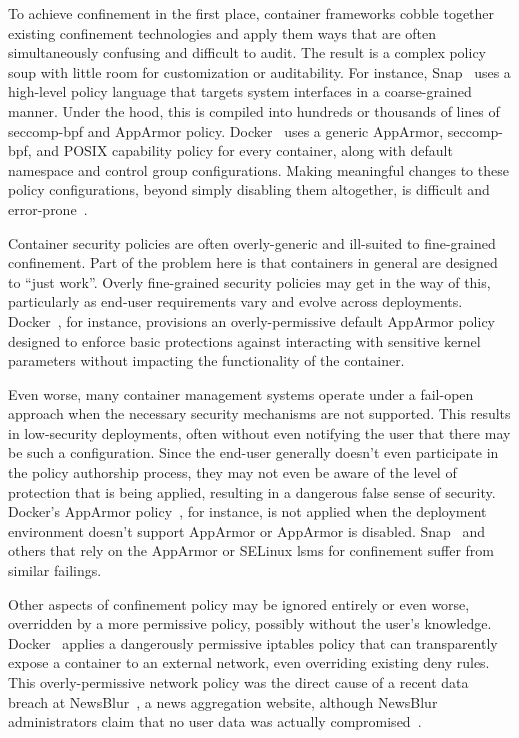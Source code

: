 To achieve confinement in the first place, container frameworks cobble together existing
confinement technologies and apply them ways that are often simultaneously confusing and
difficult to audit. The result is a complex policy soup with little room for customization
or auditability. For instance, Snap~\cite{snap} uses a high-level policy language that
targets system interfaces in a coarse-grained manner. Under the hood, this is compiled
into hundreds or thousands of lines of seccomp-bpf and AppArmor policy.
Docker~\cite{docker_security, docker_default_apparmor, docker_apparmor} uses a generic
AppArmor, seccomp-bpf, and POSIX capability policy for every container, along with default
namespace and control group configurations. Making meaningful changes to these policy
configurations, beyond simply disabling them altogether, is difficult and
error-prone~\cite{lin2018_container_security}.

Container security policies are often overly-generic and ill-suited to fine-grained
confinement. Part of the problem here is that containers in general are designed to
\enquote{just work}. Overly fine-grained security policies may get in the way of this,
particularly as end-user requirements vary and evolve across deployments.
Docker~\cite{docker_security}, for instance, provisions an overly-permissive default
AppArmor policy~\cite{docker_default_apparmor} designed to enforce basic protections
against interacting with sensitive kernel parameters without impacting the functionality
of the container. 

Even worse, many container management systems operate under a fail-open approach when the
necessary security mechanisms are not supported. This results in low-security deployments,
often without even notifying the user that there may be such a configuration. Since the
end-user generally doesn't even participate in the policy authorship process, they may not
even be aware of the level of protection that is being applied, resulting in a dangerous
false sense of security. Docker's AppArmor policy~\cite{docker_apparmor,
docker_default_apparmor}, for instance, is not applied when the deployment environment
doesn't support AppArmor or AppArmor is disabled. Snap~\cite{snap} and others that rely on
the AppArmor or SELinux \glspl{lsm} for confinement suffer from similar failings.

Other aspects of confinement policy may be ignored entirely or even worse, overridden by
a more permissive policy, possibly without the user's knowledge.
Docker~\cite{docker_security} applies a dangerously permissive iptables policy that can
transparently expose a container to an external network, even overriding existing deny
rules. This overly-permissive network policy was the direct cause of a recent data breach
at NewsBlur~\cite{newsblur}, a news aggregation website, although NewsBlur administrators
claim that no user data was actually compromised~\cite{newsblur}. 



